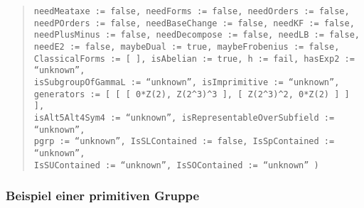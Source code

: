 \documentclass[a4paper,11pt]{article}
\theoremstyle{bla}
\begin{document}
\begin{quote}
  \hspace*{-1cm} \texttt{needMeataxe := false, needForms := false, needOrders := false,}\\
  \hspace*{-1cm} \texttt{needPOrders := false, needBaseChange := false, needKF := false,}\\
  \hspace*{-1cm} \texttt{needPlusMinus := false, needDecompose := false, needLB := false,}\\
  \hspace*{-1cm} \texttt{needE2 := false, maybeDual := true, maybeFrobenius := false,}\\
  \hspace*{-1cm} \texttt{ClassicalForms := [  ], isAbelian := true, h := fail, hasExp2 := ``unknown'',}\\
  \hspace*{-1cm} \texttt{isSubgroupOfGammaL := ``unknown'', isImprimitive := ``unknown'',}\\
  \hspace*{-1cm} \texttt{generators := [ [ [ 0*Z(2), Z(2\^{}3)\^{}3 ], [ Z(2\^{}3)\^{}2, 0*Z(2) ] ] ],}\\
  \hspace*{-1cm} \texttt{isAlt5Alt4Sym4 := ``unknown'', isRepresentableOverSubfield := ``unknown'',}\\
  \hspace*{-1cm} \texttt{pgrp := ``unknown'', IsSLContained := false, IsSpContained := ``unknown'',}\\
  \hspace*{-1cm} \texttt{IsSUContained := ``unknown'', IsSOContained := ``unknown'' )}

\end{quote}


\subsubsection*{Beispiel einer primitiven Gruppe}
\end{document}
